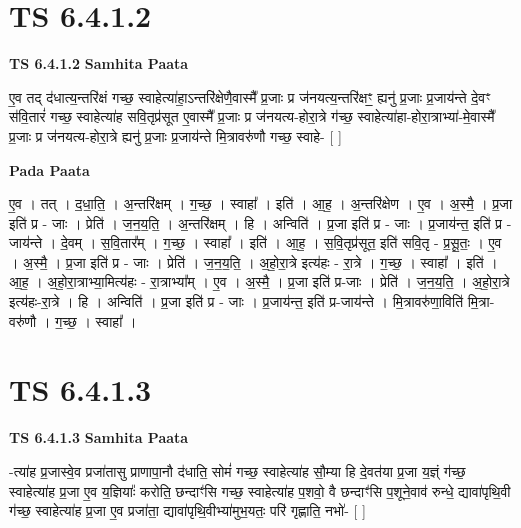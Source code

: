 \documentclass[17pt]{extarticle}
\begin{document}

\section{ TS 6.4.1.2 }

\textbf{TS 6.4.1.2 } \newline
\textbf{Samhita Paata} \newline

ए॒व तद् द॑धात्य॒न्तरि॑क्षं गच्छ॒ स्वाहेत्या॑हा॒ऽन्तरि॑क्षेणै॒वास्मै᳚ प्र॒जाः प्र ज॑नयत्य॒न्तरि॑क्षꣳ॒॒ ह्यनु॑ प्र॒जाः प्र॒जाय॑न्ते दे॒वꣳ स॑वि॒तारं॑ गच्छ॒ स्वाहेत्या॑ह सवि॒तृप्र॑सूत ए॒वास्मै᳚ प्र॒जाः प्र ज॑नयत्य-होरा॒त्रे ग॑च्छ॒ स्वाहेत्या॑हा-होरा॒त्राभ्या॑-मे॒वास्मै᳚ प्र॒जाः प्र ज॑नयत्य-होरा॒त्रे ह्यनु॑ प्र॒जाः प्र॒जाय॑न्ते मि॒त्रावरु॑णौ गच्छ॒ स्वाहे- [  ] \newline

\textbf{Pada Paata} \newline

ए॒व । तत् । द॒धा॒ति॒ । अ॒न्तरि॑क्षम् । ग॒च्छ॒ । स्वाहा᳚ । इति॑ । आ॒ह॒ । अ॒न्तरि॑क्षेण । ए॒व । अ॒स्मै॒ । प्र॒जा इति॑ प्र - जाः । प्रेति॑ । ज॒न॒य॒ति॒ । अ॒न्तरि॑क्षम् । हि । अन्विति॑ । प्र॒जा इति॑ प्र - जाः । प्र॒जाय॑न्त॒ इति॑ प्र - जाय॑न्ते । दे॒वम् । स॒वि॒तार᳚म् । ग॒च्छ॒ । स्वाहा᳚ । इति॑ । आ॒ह॒ । स॒वि॒तृप्र॑सूत॒ इति॑ सवि॒तृ - प्र॒सू॒तः॒ । ए॒व । अ॒स्मै॒ । प्र॒जा इति॑ प्र - जाः । प्रेति॑ । ज॒न॒य॒ति॒ । अ॒हो॒रा॒त्रे इत्य॑हः - रा॒त्रे । ग॒च्छ॒ । स्वाहा᳚ । इति॑ । आ॒ह॒ । अ॒हो॒रा॒त्राभ्या॒मित्य॑हः - रा॒त्राभ्या᳚म् । ए॒व । अ॒स्मै॒ । प्र॒जा इति॑ प्र-जाः । प्रेति॑ । ज॒न॒य॒ति॒ । अ॒हो॒रा॒त्रे इत्य॑हः-रा॒त्रे । हि । अन्विति॑ । प्र॒जा इति॑ प्र - जाः । प्र॒जाय॑न्त॒ इति॑ प्र-जाय॑न्ते । मि॒त्रावरु॑णा॒विति॑ मि॒त्रा-वरु॑णौ । ग॒च्छ॒ । स्वाहा᳚ ।  \newline





\section{ TS 6.4.1.3 }

\textbf{TS 6.4.1.3 } \newline
\textbf{Samhita Paata} \newline

-त्या॑ह प्र॒जास्वे॒व प्रजा॑तासु प्राणापा॒नौ द॑धाति॒ सोमं॑ गच्छ॒ स्वाहेत्या॑ह सौ॒म्या हि दे॒वत॑या प्र॒जा य॒ज्ञ्ं ग॑च्छ॒ स्वाहेत्या॑ह प्र॒जा ए॒व य॒ज्ञियाः᳚ करोति॒ छन्दाꣳ॑सि गच्छ॒ स्वाहेत्या॑ह प॒शवो॒ वै छन्दाꣳ॑सि प॒शूने॒वाव॑ रुन्धे॒ द्यावा॑पृथि॒वी ग॑च्छ॒ स्वाहेत्या॑ह प्र॒जा ए॒व प्रजा॑ता॒ द्यावा॑पृथि॒वीभ्या॑मुभ॒यतः॒ परि॑ गृह्णाति॒ नभो॑- [  ] \newline
\end{document}
